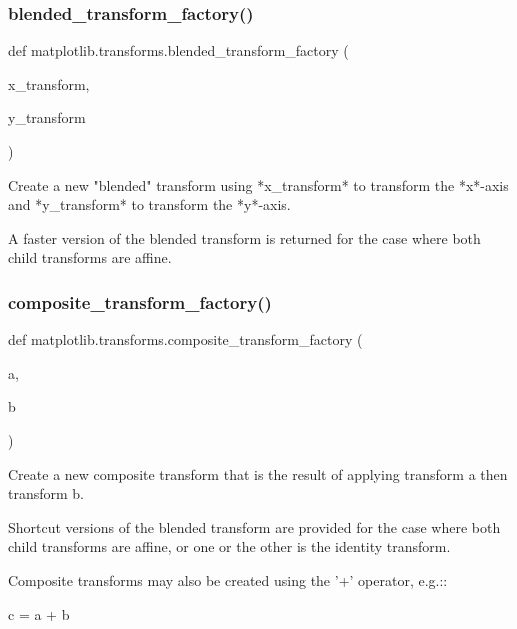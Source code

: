 \subsubsection{\texorpdfstring{blended\+\_\+transform\+\_\+factory()}{blended\_transform\_factory()}}
{\footnotesize\ttfamily def matplotlib.\+transforms.\+blended\+\_\+transform\+\_\+factory (\begin{DoxyParamCaption}\item[{}]{x\+\_\+transform,  }\item[{}]{y\+\_\+transform }\end{DoxyParamCaption})}

\begin{DoxyVerb}Create a new "blended" transform using *x_transform* to transform
the *x*-axis and *y_transform* to transform the *y*-axis.

A faster version of the blended transform is returned for the case
where both child transforms are affine.
\end{DoxyVerb}
 \mbox{\label{namespacematplotlib_1_1transforms_a99c2cda04d18eca32e54021b5a1e5161}} 
\subsubsection{\texorpdfstring{composite\+\_\+transform\+\_\+factory()}{composite\_transform\_factory()}}
{\footnotesize\ttfamily def matplotlib.\+transforms.\+composite\+\_\+transform\+\_\+factory (\begin{DoxyParamCaption}\item[{}]{a,  }\item[{}]{b }\end{DoxyParamCaption})}

\begin{DoxyVerb}Create a new composite transform that is the result of applying
transform a then transform b.

Shortcut versions of the blended transform are provided for the
case where both child transforms are affine, or one or the other
is the identity transform.

Composite transforms may also be created using the '+' operator,
e.g.::

  c = a + b
\end{DoxyVerb}
 \mbox{\label{namespacematplotlib_1_1transforms_a42267dbcc8a47f04869559e0de8f29d6}} 
